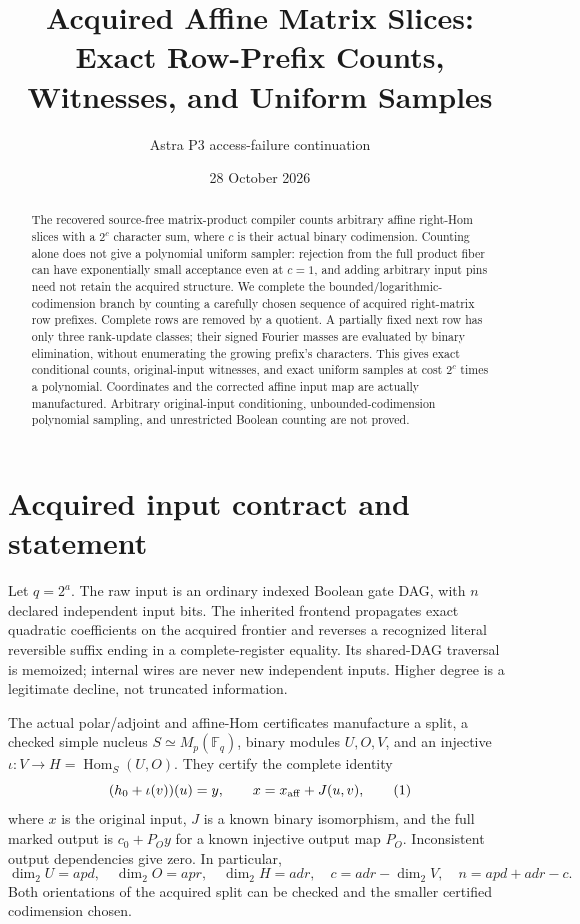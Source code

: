 \documentclass[11pt]{article}
\title{Acquired Affine Matrix Slices: Exact Row-Prefix Counts, Witnesses, and Uniform Samples}
\author{Astra P3 access-failure continuation}
\date{28 October 2026}
\newcommand{\F}{\mathbb F}
\newcommand{\Hom}{\operatorname{Hom}}
\begin{document}
\maketitle
\begin{abstract}
The recovered source-free matrix-product compiler counts arbitrary affine
right-Hom slices with a $2^c$ character sum, where $c$ is their actual binary
codimension. Counting alone does not give a polynomial uniform sampler:
rejection from the full product fiber can have exponentially small acceptance
even at $c=1$, and adding arbitrary input pins need not retain the acquired
structure. We complete the bounded/logarithmic-codimension branch by counting
a carefully chosen sequence of acquired right-matrix row prefixes. Complete
rows are removed by a quotient. A partially fixed next row has only three
rank-update classes; their signed Fourier masses are evaluated by binary
elimination, without enumerating the growing prefix's characters. This gives
exact conditional counts, original-input witnesses, and exact uniform samples
at cost $2^c$ times a polynomial. Coordinates and the corrected affine input
map are actually manufactured. Arbitrary original-input conditioning,
unbounded-codimension polynomial sampling, and unrestricted Boolean counting
are not proved.
\end{abstract}

\section{Acquired input contract and statement}

Let $q=2^a$. The raw input is an ordinary indexed Boolean gate DAG, with $n$
declared independent input bits. The inherited frontend propagates exact
quadratic coefficients on the acquired frontier and reverses a recognized
literal reversible suffix ending in a complete-register equality. Its
shared-DAG traversal is memoized; internal wires are never new independent
inputs. Higher degree is a legitimate decline, not truncated information.

The actual polar/adjoint and affine-Hom certificates manufacture a split,
a checked simple nucleus $S\simeq M_p(\F_q)$, binary modules $U,O,V$, and an
injective $\iota:V\to H=\Hom_S(U,O)$. They certify the complete identity
\[
 (h_0+\iota(v))(u)=y,\qquad
 x=x_{\rm aff}+J(u,v),
 \tag{1}
\]
where $x$ is the original input, $J$ is a known binary isomorphism, and the
full marked output is $c_0+P_Oy$ for a known injective output map $P_O$.
Inconsistent output dependencies give zero. In particular,
\[
 \dim_2U=apd,\quad \dim_2O=apr,\quad \dim_2H=adr,\quad
 c=adr-\dim_2V,\quad n=apd+adr-c.
\]
Both orientations of the acquired split can be checked and the smaller
certified codimension chosen.
\end{document}
